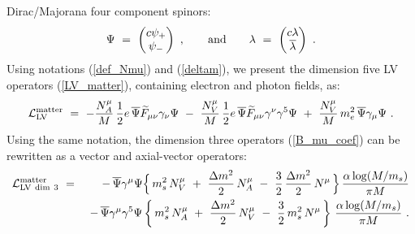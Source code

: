 \documentclass[12pt]{revtex4}
\begin{document}
Dirac/Majorana four component spinors: 
\begin{equation}
\label{Dirac_spinors}
   \Psi ~=~
                 \begin{pmatrix}{c}
                    \psi_+ \\
                    \psi_-
                 \end{pmatrix}
          ~, \qquad  {\rm and} \qquad 
   \lambda ~=~ 
                 \begin{pmatrix}{c}
                    \lambda \\
                    \overline{\lambda}
                 \end{pmatrix}
~.
\end{equation}
%
Using notations (\ref{def_Nmu}) and (\ref{deltam}), we present the
dimension five LV operators (\ref{LV_matter}), containing electron and
photon fields, as:
\begin{equation}
\nonumber
   \mathcal{L}_{\rm LV}^{\rm matter} ~=~ 
        -
       \frac{N_A^\mu}
              {M} \, \frac{1}{2}e \,
       \overline{\Psi} \widetilde{F}_{\mu\nu}
                       \gamma_\nu \Psi 
     ~-~
        \frac{N_V^\mu}
              {M} \, \frac{1}{2}e \,
       \overline{\Psi} \widetilde{F}_{\mu\nu}
                       \gamma^\nu \gamma^5 \Psi 
~+~  \frac{N_V^\mu}{M} \,m_e^2\, \overline{\Psi} \gamma_\mu \Psi
     ~.
\label{resolved_LV_Dirac}
\end{equation}
%
Using the same notation, the dimension three operators 
(\ref{B_mu_coef}) can be rewritten as a vector and 
axial-vector operators:
%
\begin{eqnarray}
\nonumber
        \mathcal{L}_{\rm{LV\ dim\ 3}}^{\rm matter} &~=~ &
-\, \overline{\Psi} \gamma^\mu \Psi 
\Big\{\,
         m_s^2\, N_V^\mu 
~+~
 \frac{\Delta m^2}{2}\, N_A^\mu 
~-~
\frac{3}{2}\, \frac{\Delta m^2}{2}\, N^\mu
       \,
\Big\}\, \frac{\alpha\log (M/m_s) }{\pi M}
\\
\label{LV_induced_dim3}
&&
-\, \overline{\Psi} \gamma^\mu \gamma^5 \Psi 
\left\{\,
        m_s^2\, N_A^\mu 
~+~
\frac{\Delta m^2}{2}\, N_V^\mu 
~-~
\frac{3}{2}\, m_s^2\, N^\mu
       \,
\right\}\, \frac{\alpha\log (M/m_s)}{\pi M}~.
\end{eqnarray}
\end{document}
